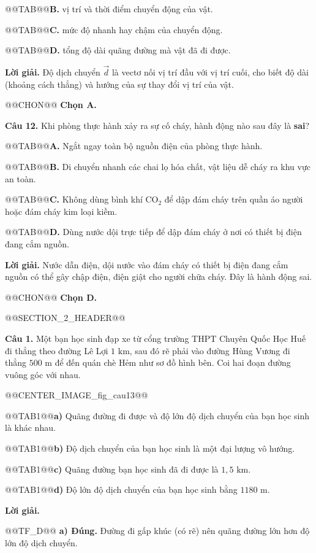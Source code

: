 \documentclass{article}
\begin{document}
@@TAB@@\textbf{B.} vị trí và thời điểm chuyển động của vật.

@@TAB@@\textbf{C.} mức độ nhanh hay chậm của chuyển động.

@@TAB@@\textbf{D.} tổng độ dài quãng đường mà vật đã đi được.

\textbf{Lời giải.} Độ dịch chuyển $\vec{d}$ là vectơ nối vị trí đầu với vị trí cuối, cho biết độ dài (khoảng cách thẳng) và hướng của sự thay đổi vị trí của vật.

@@CHON@@ \textbf{Chọn A.}

\textbf{Câu 12.} Khi phòng thực hành xảy ra sự cố cháy, hành động nào sau đây là \textbf{sai}?

@@TAB@@\textbf{A.} Ngắt ngay toàn bộ nguồn điện của phòng thực hành.

@@TAB@@\textbf{B.} Di chuyển nhanh các chai lọ hóa chất, vật liệu dễ cháy ra khu vực an toàn.

@@TAB@@\textbf{C.} Không dùng bình khí $\text{CO}_2$ để dập đám cháy trên quần áo người hoặc đám cháy kim loại kiềm.

@@TAB@@\textbf{D.} Dùng nước dội trực tiếp để dập đám cháy ở nơi có thiết bị điện đang cắm nguồn.

\textbf{Lời giải.} Nước dẫn điện, dội nước vào đám cháy có thiết bị điện đang cắm nguồn có thể gây chập điện, điện giật cho người chữa cháy. Đây là hành động sai.

@@CHON@@ \textbf{Chọn D.}

@@SECTION_2_HEADER@@

\textbf{Câu 1.} Một bạn học sinh đạp xe từ cổng trường THPT Chuyên Quốc Học Huế đi thẳng theo đường Lê Lợi $1\text{ km}$, sau đó rẽ phải vào đường Hùng Vương đi thẳng $500\text{ m}$ để đến quán chè Hẻm như sơ đồ hình bên. Coi hai đoạn đường vuông góc với nhau.

@@CENTER_IMAGE_fig_cau13@@

@@TAB1@@\textbf{a)} Quãng đường đi được và độ lớn độ dịch chuyển của bạn học sinh là khác nhau.

@@TAB1@@\textbf{b)} Độ dịch chuyển của bạn học sinh là một đại lượng vô hướng.

@@TAB1@@\textbf{c)} Quãng đường bạn học sinh đã đi được là $1{,}5\text{ km}$.

@@TAB1@@\textbf{d)} Độ lớn độ dịch chuyển của bạn học sinh bằng $1180\text{ m}$.

\textbf{Lời giải.}

@@TF_D@@ \textbf{a) Đúng.} Đường đi gấp khúc (có rẽ) nên quãng đường lớn hơn độ lớn độ dịch chuyển.
\end{document}
